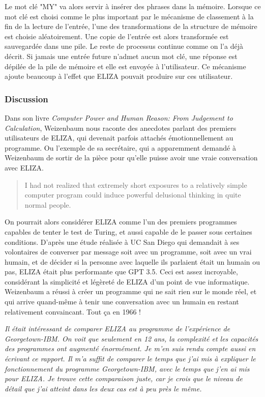 \documentclass[11pt, a4paper]{report}
\begin{document}
  Le mot clé "MY" va alors servir à insérer des phrases dans la mémoire. Lorsque ce mot clé 
  est choisi comme le plus important par le mécanisme de classement à la fin de la lecture 
  de l'entrée, l'une des transformations de la structure de mémoire est choisie aléatoirement. 
  Une copie de l'entrée est alors transformée est sauvegardée dans une pile. Le reste de processus 
  continue comme on l'a déjà décrit. Si jamais une entrée future n'admet aucun mot clé, une réponse 
  est dépilée de la pile de mémoire et elle est envoyée à l'utilisateur. Ce mécanisme ajoute 
  beaucoup à l'effet que ELIZA pouvait produire sur ces utilisateur. 

      \subsubsection*{Discussion}
Dans son livre \textit{Computer Power and Human Reason: From Judgement to Calculation}, 
Weizenbaum nous raconte des anecdotes parlant des premiers utilisateurs de ELIZA, 
qui devenait parfois attachés émotionnellement au programme. Ou l'exemple de sa 
secrétaire, qui a apparemment demandé à Weizenbaum de sortir de la pièce pour qu'elle 
puisse avoir une vraie conversation avec ELIZA.  

\begin{quote}
  I had not realized that extremely short exposures to a relatively simple computer program could 
  induce powerful delusional thinking in quite normal people.
\end{quote}

On pourrait alors considérer ELIZA comme l'un des premiers programmes capables de tenter 
le test de Turing, et aussi capable de le passer sous certaines conditions. 
D'après une étude réalisée à UC San Diego qui demandait à ses volontaires de converser 
par message soit avec un programme, soit avec un vrai humain, et de décider si la personne 
avec laquelle ils parlaient était un humain ou pas, ELIZA était plus performante que GPT 3.5. 
Ceci est assez incroyable, considérant la simplicité et légèreté de ELIZA d'un point de vue 
informatique. Weizenbaum a réussi à créer un programme qui ne sait rien sur le monde réel, 
et qui arrive quand-même à tenir une conversation avec un humain en restant relativement 
convaincant. Tout ça en 1966 ! 

\textit{Il était intéressant de comparer ELIZA au programme de l'expérience de Georgetown-IBM. 
On voit que seulement en 12 ans, la complexité et les capacités des programmes ont augmenté 
énormément. Je m'en suis rendu compte aussi en écrivant ce rapport. Il m'a suffit de comparer 
le temps que j'ai mis à expliquer le fonctionnement du programme Georgetown-IBM, avec le temps 
que j'en ai mis pour ELIZA. Je trouve cette comparaison juste, car je crois que le niveau de 
détail que j'ai atteint dans les deux cas est à peu près le même. }
\end{document}
